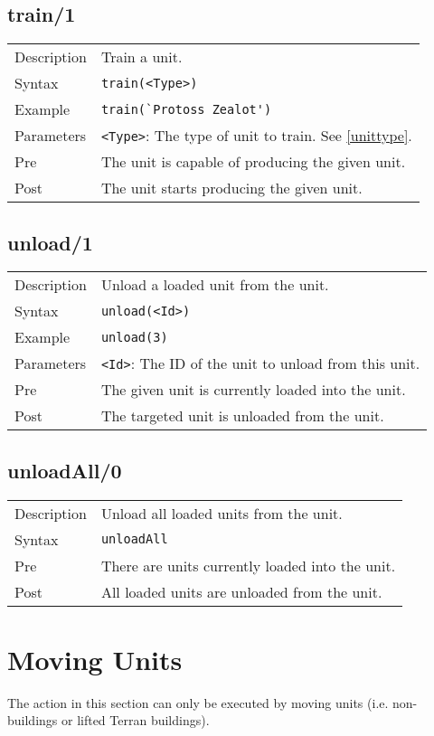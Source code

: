\subsection{train/1}
\begin{tabularx}{\textwidth}{lX}
 Description & Train a unit. \\
 Syntax & \verb|train(<Type>)| \\
 Example & \verb|train(`Protoss Zealot')| \\
 Parameters & \verb|<Type>|: The type of unit to train. See \ref{unittype}. \\
 Pre & The unit is capable of producing the given unit. \\
 Post & The unit starts producing the given unit.
\end{tabularx}

\subsection{unload/1}
\begin{tabularx}{\textwidth}{lX}
 Description & Unload a loaded unit from the unit. \\
 Syntax & \verb|unload(<Id>)| \\
 Example & \verb|unload(3)| \\
 Parameters & \verb|<Id>|: The ID of the unit to unload from this unit.\\
 Pre & The given unit is currently loaded into the unit. \\
 Post & The targeted unit is unloaded from the unit.
\end{tabularx}

\subsection{unloadAll/0}
\begin{tabularx}{\textwidth}{lX}
 Description & Unload all loaded units from the unit. \\
 Syntax & \verb|unloadAll| \\
 Pre & There are units currently loaded into the unit. \\
 Post & All loaded units are unloaded from the unit.
\end{tabularx}

\newpage

\section{Moving Units}
The action in this section can only be executed by moving units (i.e. non-buildings or lifted Terran buildings).

